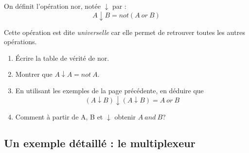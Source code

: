 \begin{exercice}[]
    On définit l'opération \og nor\fg{}, notée $\downarrow$ par : $$A\downarrow B = not(A\ or\ B)$$

    Cette opération est dite \textit{universelle} car elle permet de retrouver toutes les autres opérations.

    \begin{enumerate}
        \item 	\'Ecrire la table de vérité de nor.
        \item 	Montrer que $A\downarrow A = not\ A$.
        \item 	En utilisant les exemples de la page précédente, en déduire que $$(A\downarrow B)\downarrow(A\downarrow B) = A\ or\ B$$
        \item 	Comment à partir de A, B et $\downarrow$ obtenir $A\ and\ B$?
    \end{enumerate}
\end{exercice}

\subsection{Un exemple détaillé : le multiplexeur}

